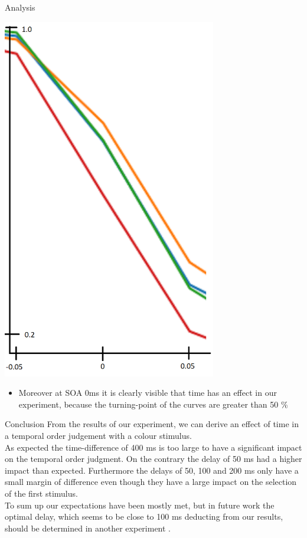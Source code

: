 \documentclass[a0paper,portrait]{baposter}
\begin{document}
\begin{poster}
\begin{posterbox}[name=results,span=1,column=2,row=0]{Analysis}
			\begin{center}
				\includegraphics[width=0.7\textwidth]{imgs/data_extract1.png}
			\end{center}
			
			\begin{itemize}
				\item Moreover at SOA 0ms it is clearly visible that time has an effect in our experiment, because the turning-point of the curves are greater than 50 \%
			\end{itemize}
			
		\end{posterbox}
		
		\begin{posterbox}[name=conclusion,span=1,column=2,row=2,below=results]{Conclusion}
			From the results of our experiment, we can derive an effect of time in a temporal order judgement with a colour stimulus.\\
			As expected the time-difference of 400 ms is too large to have a significant impact on the temporal order judgment. On the contrary the delay of 50 ms had a higher impact than expected. Furthermore the delays of 50, 100 and 200 ms only have a small margin of difference even though they have a large impact on the selection of the first stimulus.\\
			To sum up our expectations have been mostly met, but in future work the optimal delay, which seems to be close to 100 ms deducting from our results, should be determined in another experiment .
			\vspace{18pt}
		\end{posterbox}
		

\end{poster}
\end{document}
